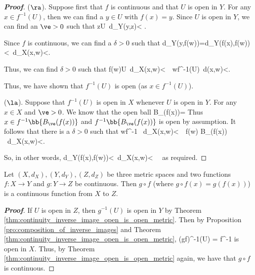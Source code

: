 \begin{proof}[\bf Proof]
($\ra$). Suppose first that $f$ is continuous and that $U$ is open in $Y$. For any $x\in f^{-1}(U)$, then we can find a $y\in U$ with $f(x)=y$. Since $U$ is open in $Y$, we can find an $\ve>0$ such that
\be
z\in U\quad {}\ d_Y(y,z)< \ve.
\ee

Since $f$ is continuous, we can find a $\delta>0$ such that
\be
d_Y(y,f(w))=d_Y(f(x),f(w))<\ve \quad {}\ d_X(x,w)<\delta.
\ee

Thus, we can find $\delta >0$ such that
\be
f(w)\in U\quad {}\ d_X(x,w)<\delta \ \ra \ w\in f^{-1}(U)\quad {}\ d(x,w)<\delta.
\ee

Thus, we have shown that $f^{-1}(U)$ is open (as $x\in f^{-1}(U)$).

($\la$). Suppose that $f^{-1}(U)$ is open in $X$ whenever $U$ is open in $Y$. For any $x\in X$ and $\ve>0$. We know that the open ball
\be
B_\ve(f(x))= \quad {}
\ee
Thus
$x\in f^{-1}\bb{B_\ve(f(x))}$ and $f^{-1}\bb{B_\ve(f(x))}$ is open by assumption. It follows that there is a $\delta>0$ such that
\be
w\in f^{-1} \quad {}\ d_X(x,w)<\delta \ \ra\  f(w) \in B_\ve(f(x)) \quad {}\ d_X(x,w)<\delta.
\ee

So, in other words,
\be
d_Y(f(x),f(w))<\ve\quad {}\ d_X(x,w)<\delta \ \ra \ 
\ee
as required.
\end{proof}



\begin{corollary}
Let $(X,d_X), (Y,d_Y), (Z,d_Z)$ be three metric spaces and two functions $f:X\to Y$ and $g:Y\to Z$ be continuous. Then $g\circ f$ (where $g\circ f(x) = g(f(x))$) is a continuous function from $X$ to $Z$.
\end{corollary}

\begin{proof}[\bf Proof]
If $U$ is open in $Z$, then $g^{-1}(U)$ is open in $Y$ by Theorem \ref{thm:continuity_inverse_image_open_is_open_metric}. Then by Proposition \ref{pro:composition_of_inverse_images} and Theorem \ref{thm:continuity_inverse_image_open_is_open_metric},
\be
(g\circ f)^{-1}(U) = f^{-1}
\ee
is open in $X$. Thus, by Theorem \ref{thm:continuity_inverse_image_open_is_open_metric} again, we have that $g\circ f$ is continuous.
\end{proof}




